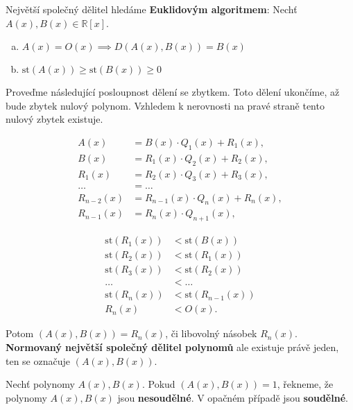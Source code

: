 \begin{pozn}
  Největší společný dělitel hledáme \textbf{Euklidovým algoritmem}: Nechť $A(x), B(x) \in \mathbb R [x]$.
  \begin{enumerate}[a.]
    \item $A(x) = O(x) \implies D(A(x), B(x)) = B(x)$
    \item $\text{st}(A(x)) \geq \text{st}(B(x)) \geq 0$
  \end{enumerate}
  Proveďme následující posloupnost dělení se zbytkem. Toto dělení ukončíme, až bude zbytek nulový polynom.
  Vzhledem k nerovnosti na pravé straně tento nulový zbytek existuje.

  \begin{minipage}{0.6\textwidth}
  \begin{align*}
    A(x) & = B(x) \cdot Q_1(x) + R_1(x),  \\
    B(x) & = R_1(x) \cdot Q_2(x) + R_2(x),  \\
    R_1(x) & = R_2(x) \cdot Q_3(x) + R_3(x), \\
    \dots & = \dots \\
    R_{n-2}(x) & = R_{n-1}(x) \cdot Q_n(x) + R_n(x),  \\
    R_{n-1}(x) & = R_{n}(x) \cdot Q_{n+1}(x),
  \end{align*}
  \end{minipage}
  \hfill
  \begin{minipage}{0.38\textwidth}
  \begin{align*}
   \text{st}(R_1(x)) & < \text{st}(B(x)) \\
   \text{st}(R_2(x)) & < \text{st}(R_1(x)) \\
 \text{st}(R_3(x)) & < \text{st}(R_2(x)) \\
    \dots & < \dots \\
 \text{st}(R_n(x)) & < \text{st}(R_{n-1}(x)) \\
   R_{n}(x) & < O(x).
  \end{align*}
  \end{minipage}

  Potom $(A(x), B(x)) = R_n(x)$, či libovolný násobek $R_n(x)$. \textbf{Normovaný největší společný dělitel polynomů}
  ale existuje právě jeden, ten se označuje $(A(x), B(x))$.
\end{pozn}

\begin{definition}
  Nechť polynomy $A(x), B(x)$. Pokud $(A(x), B(x)) = 1$, řekneme, že polynomy $A(x), B(x)$ jsou \textbf{nesoudělné}. V opačném případě jsou \textbf{soudělné}.
\end{definition}

